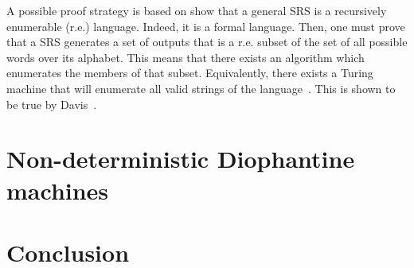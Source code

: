 \documentclass[12pt]{article}
\begin{document}
A possible proof strategy is based on show that a general SRS is a recursively enumerable (r.e.) language. Indeed, it is a formal language. Then, one must prove that a SRS generates a set of outputs that is a r.e. subset of the set of all possible words over its alphabet. This means that there exists an algorithm which enumerates the members of that subset. Equivalently, there exists a Turing machine that will enumerate all valid strings of the language~\cite{}. This is shown to be true by Davis~\cite[pp. 84--85]{}.


\section{Non-deterministic Diophantine machines}\label{sec:nddm}

\section{Conclusion}\label{sec:conc}



\end{document}
